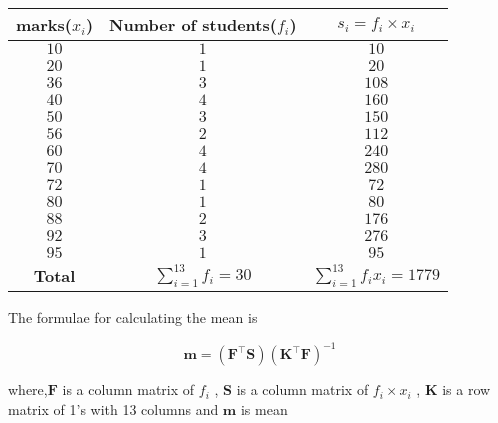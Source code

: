 \documentclass[journal,12pt,twocolumn]{IEEEtran}
\let\vec\mathbf
\providecommand{\brak}[1]{\ensuremath{\left(#1\right)}}
\begin{document}
       \begin{table}[!ht]
            \centering
            \resizebox{\columnwidth}{!}
            {
                \begin{tabular}{|c| c| c| }
                \hline
                 marks($x_{i}$) & Number of students($f_{i}$) & $ s_{i} = f_{i}\times x_{i}$ \\
                 \hline
                 $10$   & $1$ & $10$ \\
                 $20$   & $1$ & $20$ \\
                 $36$   & $3$ & $108$ \\
                 $40$   & $4$ & $160$ \\
                 $50$   & $3$ & $150$ \\
                 $56$   & $2$ & $112$ \\
                 $60$   & $4$ & $240$ \\
                 $70$   & $4$ & $280$ \\
                 $72$   & $1$ & $72$ \\
                 $80$   & $1$ & $80$ \\
                 $88$   & $2$ & $176$ \\
                 $92$   & $3$ & $276$ \\
                 $95$   & $1$ & $95$ \\
                 \hline
                    \textbf{Total} & $\sum_{i=1}^{13} f_{i} = 30$ & $\sum_{i=1}^{13} f_{i}x_{i} = 1779$ \\
                 \hline
                \end{tabular}
            }
            \caption{}
            \label{table:table2}
       \end{table}
       
       
    The formulae for calculating the mean is 
    
    \begin{equation}
       \label{eq:formulae}
       \vec{m} = \brak{\vec{F^{\top}}\vec{S}}\brak{\vec{K^{\top}}\vec{F}}^{-1}
    \end{equation}
    
    where,$\vec{F}$ is a column matrix of $f_{i}$ , $\vec{S}$ is a column matrix of $f_{i}\times x_{i}$ , $\vec{K}$ is a row matrix of 1's with 13 columns and $\vec{m}$ is mean 
    
\end{document}
